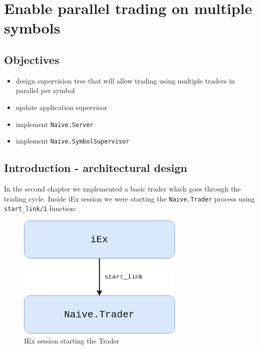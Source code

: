 \documentclass[
]{book}
\providecommand{\tightlist}{%
  \setlength{\itemsep}{0pt}\setlength{\parskip}{0pt}}
\begin{document}
\hypertarget{enable-parallel-trading-on-multiple-symbols}{%
\chapter{Enable parallel trading on multiple symbols}\label{enable-parallel-trading-on-multiple-symbols}}

\hypertarget{objectives-4}{%
\section{Objectives}\label{objectives-4}}

\begin{itemize}
\tightlist
\item
  design supervision tree that will allow trading using multiple traders in parallel per symbol
\item
  update application supervisor
\item
  implement \texttt{Naive.Server}
\item
  implement \texttt{Naive.SymbolSupervisor}
\end{itemize}

\hypertarget{introduction---architectural-design}{%
\section{Introduction - architectural design}\label{introduction---architectural-design}}

In the second chapter we implemented a basic trader which goes through the trading cycle. Inside iEx session we were starting the \texttt{Naive.Trader} process using \texttt{start\_link/1} function:

\begin{figure}
\centering
\includegraphics{images/chapter_05_01_current_state.png}
\caption{IEx session starting the Trader}
\end{figure}
\end{document}
